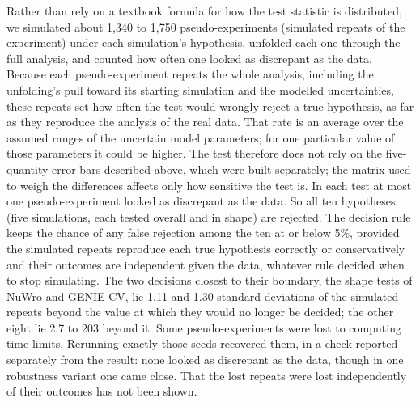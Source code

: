 Rather than rely on a textbook formula for how the test statistic is distributed, we simulated about 1,340 to 1,750 pseudo-experiments (simulated repeats of the experiment) under each simulation's hypothesis, unfolded each one through the full analysis, and counted how often one looked as discrepant as the data. Because each pseudo-experiment repeats the whole analysis, including the unfolding's pull toward its starting simulation and the modelled uncertainties, these repeats set how often the test would wrongly reject a true hypothesis, as far as they reproduce the analysis of the real data. That rate is an average over the assumed ranges of the uncertain model parameters; for one particular value of those parameters it could be higher. The test therefore does not rely on the five-quantity error bars described above, which were built separately; the matrix used to weigh the differences affects only how sensitive the test is. In each test at most one pseudo-experiment looked as discrepant as the data. So all ten hypotheses (five simulations, each tested overall and in shape) are rejected. The decision rule keeps the chance of any false rejection among the ten at or below 5\%, provided the simulated repeats reproduce each true hypothesis correctly or conservatively and their outcomes are independent given the data, whatever rule decided when to stop simulating. The two decisions closest to their boundary, the shape tests of NuWro and GENIE CV, lie 1.11 and 1.30 standard deviations of the simulated repeats beyond the value at which they would no longer be decided; the other eight lie 2.7 to 203 beyond it. Some pseudo-experiments were lost to computing time limits. Rerunning exactly those seeds recovered them, in a check reported separately from the result: none looked as discrepant as the data, though in one robustness variant one came close. That the lost repeats were lost independently of their outcomes has not been shown.
